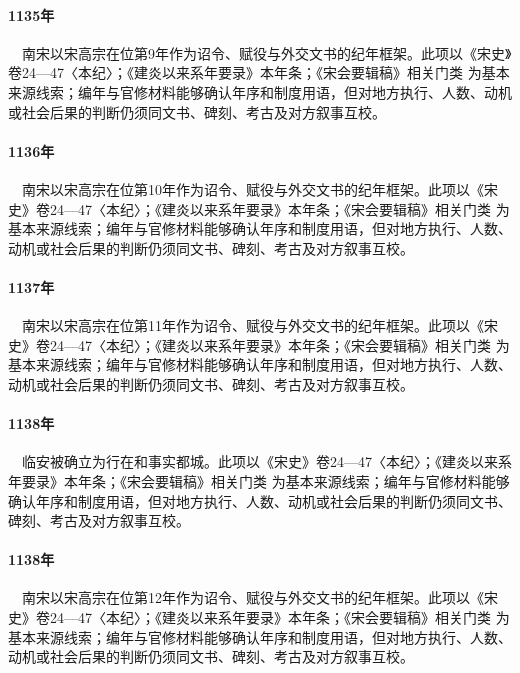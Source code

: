 \paragraph{1135年}　南宋以宋高宗在位第9年作为诏令、赋役与外交文书的纪年框架。此项以《宋史》卷24—47〈本纪〉；《建炎以来系年要录》本年条；《宋会要辑稿》相关门类 为基本来源线索；编年与官修材料能够确认年序和制度用语，但对地方执行、人数、动机或社会后果的判断仍须同文书、碑刻、考古及对方叙事互校。

\paragraph{1136年}　南宋以宋高宗在位第10年作为诏令、赋役与外交文书的纪年框架。此项以《宋史》卷24—47〈本纪〉；《建炎以来系年要录》本年条；《宋会要辑稿》相关门类 为基本来源线索；编年与官修材料能够确认年序和制度用语，但对地方执行、人数、动机或社会后果的判断仍须同文书、碑刻、考古及对方叙事互校。

\paragraph{1137年}　南宋以宋高宗在位第11年作为诏令、赋役与外交文书的纪年框架。此项以《宋史》卷24—47〈本纪〉；《建炎以来系年要录》本年条；《宋会要辑稿》相关门类 为基本来源线索；编年与官修材料能够确认年序和制度用语，但对地方执行、人数、动机或社会后果的判断仍须同文书、碑刻、考古及对方叙事互校。

\paragraph{1138年}　临安被确立为行在和事实都城。此项以《宋史》卷24—47〈本纪〉；《建炎以来系年要录》本年条；《宋会要辑稿》相关门类 为基本来源线索；编年与官修材料能够确认年序和制度用语，但对地方执行、人数、动机或社会后果的判断仍须同文书、碑刻、考古及对方叙事互校。

\paragraph{1138年}　南宋以宋高宗在位第12年作为诏令、赋役与外交文书的纪年框架。此项以《宋史》卷24—47〈本纪〉；《建炎以来系年要录》本年条；《宋会要辑稿》相关门类 为基本来源线索；编年与官修材料能够确认年序和制度用语，但对地方执行、人数、动机或社会后果的判断仍须同文书、碑刻、考古及对方叙事互校。

